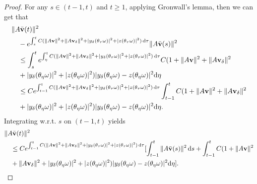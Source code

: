 \documentclass{elsarticle}
\theoremstyle{definition}
\numberwithin{equation}{section}
\renewcommand{\d}{{\rm{d}}}
\begin{document}
\begin{proof}
For any $s\in(t-1,t)$ and $t\geq 1$, applying Gronwall's lemma, then  we can get that
\begin{align*}
&\|A\bar{\textbf{v}}(t)\|^2\nonumber\\
&\quad-e^{\int_s^tC( \|A\textbf{v}\|^2+\|A\textbf{v}_\delta\|^2+|y_\delta(\theta_\tau\omega)|^2+|z(\theta_\tau\omega)|^2)\, \d \tau}\|A\bar{\textbf{v}}(s)\|^2\nonumber\\
&\quad \leq \int_s^te^{\int_\eta^tC( \|A\textbf{v}\|^2+\|A\textbf{v}_\delta\|^2+|y_\delta(\theta_\tau\omega)|^2+|z(\theta_\tau\omega)|^2)\, \d \tau}
C(1+\|A\textbf{v}\|^2+\|A\textbf{v}_\delta\|^2\nonumber\\
&\quad +|y_\delta(\theta_\eta\omega)|^2+|z(\theta_\eta\omega)|^2
 )|y_\delta(\theta_\eta\omega)-z(\theta_\eta\omega)|^2 \d \eta\nonumber\\
&\quad \leq Ce^{\int_{t-1}^tC( \|A\textbf{v}\|^2+\|A\textbf{v}_\delta\|^2+|y_\delta(\theta_\tau\omega)|^2+|z(\theta_\tau\omega)|^2)\, \d \tau}
\int_{t-1}^t C(1+\|A\textbf{v}\|^2+\|A\textbf{v}_\delta\|^2\nonumber\\
&\quad +|y_\delta(\theta_\eta\omega)|^2+|z(\theta_\eta\omega)|^2
 )|y_\delta(\theta_\eta\omega)-z(\theta_\eta\omega)|^2 \d \eta.
\end{align*}
Integrating w.r.t. $s$ on $(t-1,t)$ yields
\begin{align}\label{9.6}
&\|A\bar{\textbf{v}}(t)\|^2\nonumber\\
&\quad \leq Ce^{\int_{t-1}^tC( \|A\textbf{v}\|^2+\|A\textbf{v}_\delta\|^2+|y_\delta(\theta_\tau\omega)|^2+|z(\theta_\tau\omega)|^2)\, \d \tau}
[\int_{t-1}^t\|A\bar{\textbf{v}}(s)\|^2\, \d s+\int_{t-1}^t C(1+\|A\textbf{v}\|^2\nonumber\\
&\quad +\|A\textbf{v}_\delta\|^2+|y_\delta(\theta_\eta\omega)|^2+|z(\theta_\eta\omega)|^2
 )|y_\delta(\theta_\eta\omega)-z(\theta_\eta\omega)|^2 \d \eta].
\end{align}


\end{proof}
\end{document}
